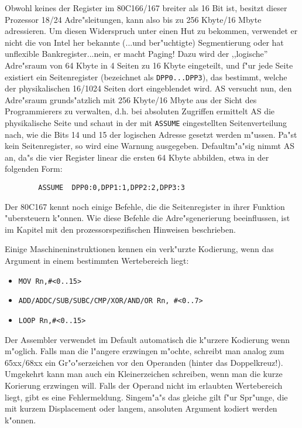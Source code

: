 \documentclass[12pt,a4paper,twoside]{report}
\newcommand{\tty}[1]{{\tt #1}}
\begin{document}
Obwohl keines der Register im 80C166/167 breiter als 16 Bit ist, besitzt
dieser Prozessor 18/24 Adre"sleitungen, kann also bis zu 256 Kbyte/16 Mbyte
adressieren.  Um diesen Widerspruch unter einen Hut zu bekommen, verwendet
er nicht die von Intel her bekannte (...und ber"uchtigte) Segmentierung oder
hat unflexible Bankregister...nein, er macht Paging!  Dazu wird der ,,logische''
Adre"sraum von 64 Kbyte in 4 Seiten zu 16 Kbyte eingeteilt, und f"ur jede
Seite existiert ein Seitenregister (bezeichnet als \tty{DPP0...DPP3}), das
bestimmt, welche der physikalischen 16/1024 Seiten dort eingeblendet wird.  AS versucht
nun, den Adre"sraum grunds"atzlich mit 256 Kbyte/16 Mbyte aus der Sicht des
Programmierers zu verwalten, d.h. bei absoluten Zugriffen ermittelt AS die
physikalische Seite und schaut in der mit \tty{ASSUME} eingestellten
Seitenverteilung nach, wie die Bits 14 und 15 der logischen Adresse gesetzt
werden m"ussen.  Pa"st kein Seitenregister, so wird eine Warnung ausgegeben.
Defaultm"a"sig nimmt AS an, da"s die vier Register linear die ersten 64 Kbyte
abbilden, etwa in der folgenden Form:
\begin{verbatim}
        ASSUME  DPP0:0,DPP1:1,DPP2:2,DPP3:3
\end{verbatim}
Der 80C167 kennt noch einige Befehle, die die Seitenregister in ihrer
Funktion "ubersteuern k"onnen.  Wie diese Befehle die Adre"sgenerierung
beeinflussen, ist im Kapitel mit den prozessorspezifischen Hinweisen
beschrieben.
\par
Einige Maschineninstruktionen kennen ein verk"urzte Kodierung, wenn das
Argument in einem bestimmten Wertebereich liegt:
\begin{itemize}
\item{\verb!MOV Rn,#<0..15>!}
\item{\verb!ADD/ADDC/SUB/SUBC/CMP/XOR/AND/OR Rn, #<0..7>!}
\item{\verb!LOOP Rn,#<0..15>!}
\end{itemize}
Der Assembler verwendet im Default automatisch die k"urzere Kodierung
wenn m"oglich.  Falls man die l"angere erzwingen m"ochte, schreibt
man analog zum 65xx/68xx ein Gr"o"serzeichen vor den Operanden (hinter
das Doppelkreuz!).  Umgekehrt kann man auch ein Kleinerzeichen schreiben,
wenn man die kurze Korierung erzwingen will.  Falls der Operand nicht
im erlaubten Wertebereich liegt, gibt es eine Fehlermeldung.  Singem"a"s
das gleiche gilt f"ur Spr"unge, die mit kurzem Displacement oder langem,
ansoluten Argument kodiert werden k"onnen.

\end{document}
